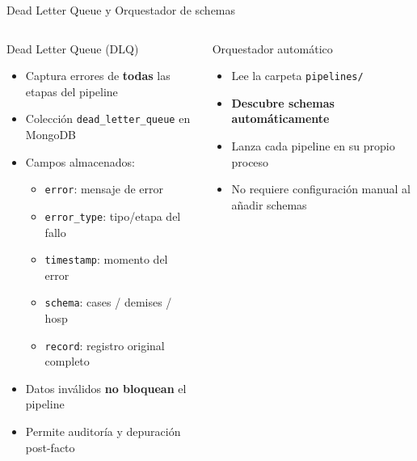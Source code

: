 \documentclass[aspectratio=169, 10pt]{beamer}
\begin{document}
\begin{frame}{Dead Letter Queue y Orquestador de schemas}
  \begin{columns}[t]
      \begin{alertblock}{Dead Letter Queue (DLQ)}
        \begin{itemize}\setlength\itemsep{2pt}
          \item Captura errores de \textbf{todas} las etapas del pipeline
          \item Colecci\'on \texttt{dead\_letter\_queue} en MongoDB
          \item Campos almacenados:
            \begin{itemize}\setlength\itemsep{1pt}
              \item \texttt{error}: mensaje de error
              \item \texttt{error\_type}: tipo/etapa del fallo
              \item \texttt{timestamp}: momento del error
              \item \texttt{schema}: cases / demises / hosp
              \item \texttt{record}: registro original completo
            \end{itemize}
          \item Datos inv\'alidos \textbf{no bloquean} el pipeline
          \item Permite auditor\'ia y depuraci\'on post-facto
        \end{itemize}
      \end{alertblock}
      \begin{block}{Orquestador autom\'atico}
        \begin{itemize}\setlength\itemsep{3pt}
          \item Lee la carpeta \texttt{pipelines/}
          \item \textbf{Descubre schemas autom\'aticamente}
          \item Lanza cada pipeline en su propio proceso
          \item No requiere configuraci\'on manual al a\~nadir schemas
        \end{itemize}
      \end{block}
      \vspace{6pt}
      \begin{tikzpicture}[node distance=0.4cm]

\end{tikzpicture}
\end{columns}
\end{frame}
\end{document}
